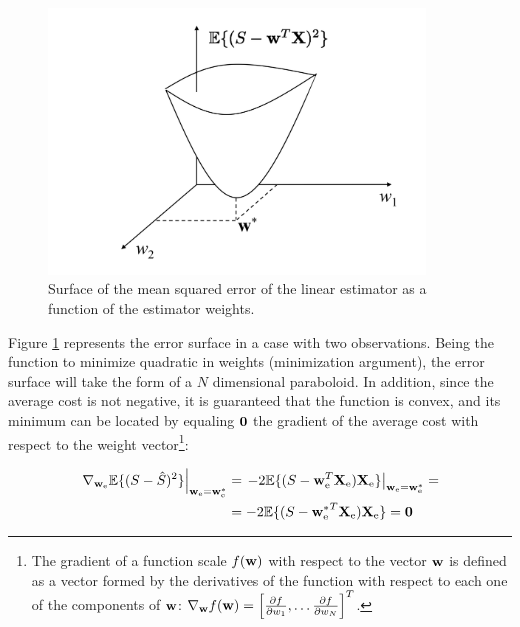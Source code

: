 \begin{figure}[htb]
  \begin{center}
  \includegraphics[width=10cm]{Figures//linear_est_error_surface.png}
    \caption{Surface of the mean squared error of the linear estimator as a function of the estimator weights.}
    \label{fig:linear_est_error_surface}
  \end{center}
\end{figure}

Figure \ref{fig:linear_est_error_surface} represents the error surface in a case with two observations. Being the function to minimize quadratic in weights (minimization argument), the error surface will take the form of a $N$ dimensional paraboloid. In addition, since the average cost is not negative, it is guaranteed that the function is convex, and its minimum can be located by equaling $\bf 0$ the gradient of the average cost with respect to the weight vector\footnote{The gradient of a function scale $f({\bf w})$ with respect to the vector ${\bf w}$ is defined as a vector formed by the derivatives of the function with respect to each one of the components of $\bf w$: $\nabla_{{\bf w}} f({\bf w}) = \left[\frac{\partial f}{\partial w_1}, \dots \frac{\partial f}{\partial w_N}\right]^T$.}:

\begin{equation}
\label{ec:ecs_normales_1}
\begin{split}
\left. \nabla_{{\bf w}_{\text{e}}} \mathbb{E}\{(S - \hat S)^2\} \right|_{{\bf w}_{\text{e}} 
   = {\bf w}_{\text{e}}^*} 
 & = \left. -2 \mathbb{E}\{(S - {\bf w}_{\text{e}}^T {\bf X}_{\text{e}}) {\bf X}_{\text{e}} \} \right|_{{\bf w}_{\text{e}} = {\bf w}_{\text{e}}^*} = \\
 & = -2 \mathbb{E}\{(S -  {{\bf w}_{\text{e}}^*}^T {\bf X}_{\text{e}}) {\bf X}_{\text{e}} \} = {\bf 0}
\end{split}
\end{equation}

